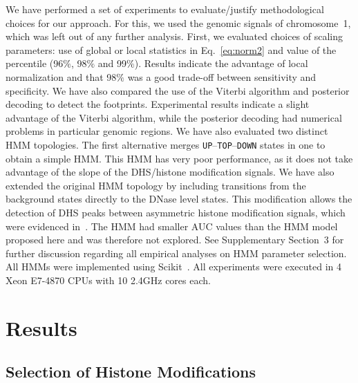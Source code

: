 \documentclass{bioinfo}
\begin{document}
\begin{methods}
We have performed a set of experiments to evaluate/justify methodological choices for our
approach. For this, we used the genomic signals of chromosome~1, which was left out of any
further analysis. First, we evaluated choices of scaling parameters: use of global or local
statistics in Eq.~\ref{eq:norm2} and value of the percentile (96$\%$, 98$\%$ and 99$\%$).
Results indicate the advantage of local normalization and that 98$\%$ was a good trade-off
between sensitivity and specificity. We have also compared the use of the Viterbi algorithm
and posterior decoding to detect the footprints. Experimental results indicate a slight
advantage of the Viterbi algorithm, while the posterior decoding had numerical problems
in particular genomic regions. We have also evaluated two distinct HMM topologies. The first
alternative merges {\tt UP}--{\tt TOP}--{\tt DOWN} states in one to obtain a simple HMM. This HMM has
very poor performance, as it does not take advantage of the slope of the DHS/histone modification signals.
We have also extended the original HMM topology by including transitions from the background
states directly to the DNase level states. This modification allows the detection of DHS peaks
between asymmetric histone modification signals, which were evidenced in~\cite{kundaje2012}.
The HMM had smaller AUC values than the HMM model proposed here and was therefore not
explored. See Supplementary Section~3 for further discussion regarding all empirical
analyses on HMM parameter selection. All HMMs were implemented using Scikit~\citep{pedregosa2011}.
All experiments were executed in 4 Xeon E7-4870 CPUs with 10 2.4GHz cores each.

\end{methods}

\section{Results}
\label{sec:results}

\subsection{Selection of Histone Modifications}
\end{document}
